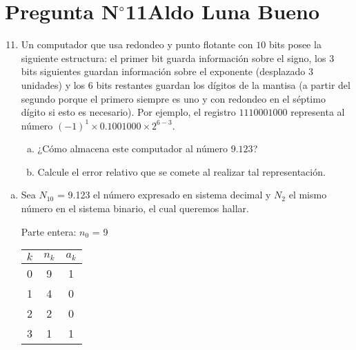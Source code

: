\section{Pregunta N$^{\circ}$11\qquad Aldo Luna Bueno}

\begin{frame}
	\begin{enumerate}\setcounter{enumi}{10}
		\item

		      Un computador que usa redondeo y punto flotante con $10$
		      bits posee la siguiente estructura:
		      el primer bit guarda información sobre el signo, los 3 bits
		      siguientes guardan información sobre el exponente
		      (desplazado $3$ unidades) y los $6$ bits restantes guardan
		      los dígitos de la mantisa (a partir del segundo porque el
		      primero siempre es uno y con redondeo en el séptimo dígito
		      si esto es necesario).
		      Por ejemplo, el registro $1110001000$ representa al número
		      ${\left(-1\right)}^{1}\times 0.1001000\times 2^{6-3}$.

		      \begin{enumerate}[a)]
			      \item

			            ¿Cómo almacena este computador al número $9.123$?

			      \item

			            Calcule el error relativo que se comete al realizar
			            tal representación.
		      \end{enumerate}
	\end{enumerate}

	\begin{solution}            
		\begin{enumerate}[a)]
			\item
			      Sea $N_{10}$ = 9.123 el número expresado en sistema decimal y $N_{2}$ el mismo número en el sistema binario, el cual queremos hallar.

			      Parte entera: $n_{0}$ = 9
         
			      \begin{tabular}{c|c|c}
				      $k$ & $n_{k}$ & $a_{k}$ \\ \hline
				      0   & 9       & 1       \\ 
				      1   & 4       & 0       \\ 
				      2   & 2       & 0       \\ 
				      3   & 1       & 1
			      \end{tabular}
         

\end{enumerate}
\end{solution}
\end{frame}
